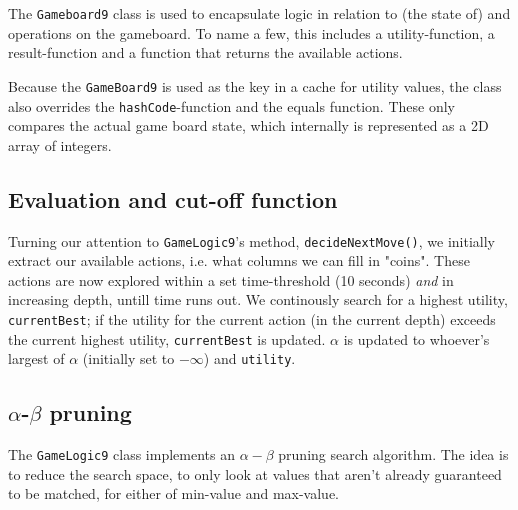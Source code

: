 The \texttt{Gameboard9} class is used to encapsulate logic in relation to (the state of) and operations on the gameboard. To name a few, this includes a utility-function, a result-function and a function that returns the available actions.

Because the \texttt{GameBoard9} is used as the key in a cache for utility values, the class also overrides the \texttt{hashCode}-function and the equals function. These only compares the actual game board state, which internally is represented as a 2D array of integers.

\subsection{Evaluation and cut-off function}

Turning our attention to \texttt{GameLogic9}'s method, \texttt{decideNextMove()}, we initially extract our available actions, i.e. what columns we can fill in "coins". These actions are now explored within a set time-threshold (10 seconds) \textit{and} in increasing depth, untill time runs out. We continously search for a highest utility, \texttt{currentBest}; if the utility for the current action (in the current depth) exceeds the current highest utility, \texttt{currentBest} is updated. $\alpha$ is updated to whoever's largest of $\alpha$ (initially set to $-\infty$) and \texttt{utility}.




\subsection{$\alpha$-$\beta$ pruning}
The \texttt{GameLogic9} class implements an $\alpha-\beta$ pruning search algorithm. The idea is to reduce the search space, to only look at values that aren't already guaranteed to be matched, for either of min-value and max-value.